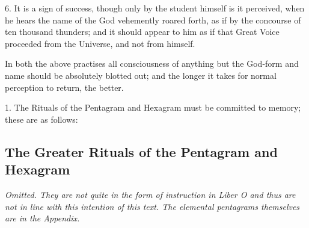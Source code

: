 6. It is a sign of success, though only by the student himself is it perceived, when he hears the name of the God vehemently roared forth, as if by the concourse of ten thousand thunders; and it should appear to him as if that Great Voice proceeded from the Universe, and not from himself.

In both the above practises all consciousness of anything but the God-form and name should be absolutely blotted out; and the longer it takes for normal perception to return, the better.



1. The Rituals of the Pentagram and Hexagram must be committed to memory; these are as follows:

\subsection*{The Greater Rituals of the Pentagram and Hexagram}

\textit{Omitted. They are not quite in the form of instruction in Liber O and thus are not in line with this intention of this text. The elemental pentagrams themselves are in the Appendix.}


